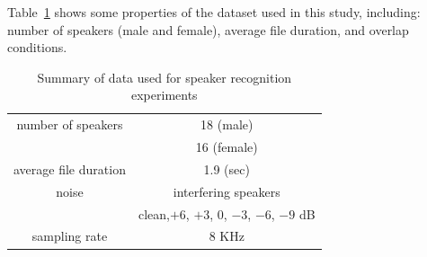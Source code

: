Table~\ref{tab:ch2_data_summary} shows some properties of the dataset used in this study, including: number of speakers (male and female), average file duration, and overlap conditions. 

\begin{table}[h!]
	\begin{center}
		\caption{ Summary of data used for speaker recognition experiments}
		\begin{tabular}{| c | c |}
			\hline
			\hline
			number of speakers	& 18 (male)  \\
			\hspace{4mm}			&  16 (female) \\
			\hline
			average file duration	&   1.9 (sec) \\ 
			\hline
			noise				& interfering speakers \\
			\hspace{4mm}			& clean,$+6$, $+3$, $0$, $-3$, $-6$, $-9$ dB \\
			\hline
			sampling rate			& $8$ KHz \\
			\hline
			\hline	
		\end{tabular}
		\label{tab:ch2_data_summary}
	\end{center}
\end{table}

